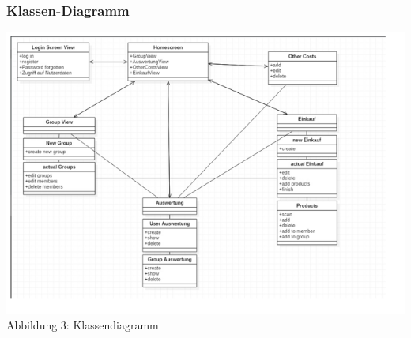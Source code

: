 \documentclass[12pt,a4paper]{article}
\begin{document}
\subsubsection*{Klassen-Diagramm}
\includegraphics[scale=0.6, origin=l]{Klassendiagramm.png}
\\
\footnotesize Abbildung 3: Klassendiagramm
\normalsize
\\
\linebreak
\end{document}
